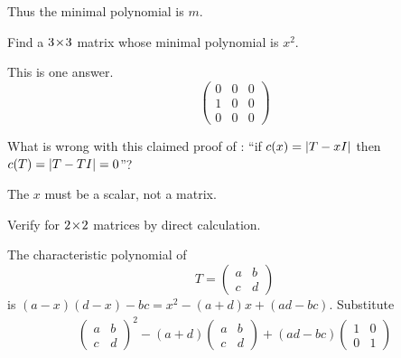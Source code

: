 \begin{exercises}
\begin{answer}
\begin{equation*}
        \end{equation*}
        Thus the minimal polynomial is $m$.
      \end{answer}
   \item 
     Find a \( 3 \! \times \! 3 \) matrix whose minimal
     polynomial is \( x^2 \).
     \begin{answer}
        This is one answer.
        \begin{equation*}
            \begin{pmatrix}
              0  &0  &0  \\
              1  &0  &0  \\
              0  &0  &0
            \end{pmatrix}
        \end{equation*} 
      \end{answer}
  \item 
     What is wrong with this claimed proof of
     :
      ``if \( c(x)=\deter{T-xI} \) then \( c(T)=\deter{T-TI}=0 \)''?
     \cite{Cullen}
     \begin{answer}
       The \( x \) must be a scalar, not a matrix.
     \end{answer}
  \item 
    Verify  for \( 2 \! \times \! 2 \)
    matrices by direct calculation.
    \begin{answer}
      The characteristic polynomial of
      \begin{equation*}
         T=\begin{pmatrix}
              a  &b  \\
              c  &d
           \end{pmatrix}
      \end{equation*}
      is \( (a-x)(d-x)-bc=x^2-(a+d)x+(ad-bc) \).
      Substitute
      \begin{multline*}
         \begin{pmatrix}
              a  &b  \\
              c  &d
         \end{pmatrix}^2
         -
         (a+d)\begin{pmatrix}
            a  &b  \\
            c  &d
         \end{pmatrix}
         +
         (ad-bc)\begin{pmatrix}
            1  &0  \\
            0  &1
         \end{pmatrix}                            \\

\end{multline*}
\end{answer}
\end{exercises}
